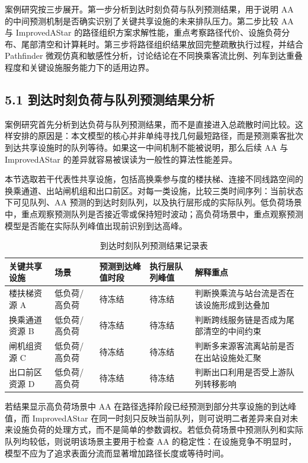 \documentclass[UTF8,a4paper,12pt]{ctexart}
\begin{document}
案例研究按三步展开。第一步分析到达时刻负荷与队列预测结果，用于说明 AA 的中间预测机制是否确实识别了关键共享设施的未来排队压力。第二步比较 AA 与 ImprovedAStar 的路径组织方案求解性能，重点考察路径代价、设施负荷分布、尾部清空和计算耗时。第三步将路径组织结果放回完整疏散执行过程，并结合 Pathfinder 微观仿真和敏感性分析，讨论结论在不同换乘客流比例、列车到达重叠程度和关键设施服务能力下的适用边界。

\subsection{5.1 到达时刻负荷与队列预测结果分析}

案例研究首先分析到达负荷与队列预测结果，而不是直接进入总疏散时间比较。这样安排的原因是：本文模型的核心并非单纯寻找几何最短路径，而是预测乘客批次到达共享设施时的队列等待。如果这一中间机制不能被说明，那么后续 AA 与 ImprovedAStar 的差异就容易被误读为一般性的算法性能差异。

本节选取若干代表性共享设施，包括高换乘参与度的楼扶梯、连接不同线路空间的换乘通道、出站闸机组和出口前区。对每一类设施，比较三类时间序列：当前状态下可见队列、AA 预测的到达时刻队列，以及执行层形成的实际队列。低负荷场景中，重点观察预测队列是否接近零或保持短时波动；高负荷场景中，重点观察预测模型是否能在实际队列峰值出现前识别到达高峰。

\begin{table}[htbp]
\centering
\caption{到达时刻队列预测结果记录表}
\small
\begin{tabular}{p{}p{}p{}p{}p{}}
\toprule
关键共享设施 & 场景 & 预测到达峰值时段 & 执行层队列峰值 & 解释重点 \\
\midrule
楼扶梯资源 A & 低负荷/高负荷 & 待冻结 & 待冻结 & 判断换乘流与站台流是否在该设施形成到达叠加 \\
换乘通道资源 B & 低负荷/高负荷 & 待冻结 & 待冻结 & 判断跨线服务链是否成为尾部清空的中间约束 \\
闸机组资源 C & 低负荷/高负荷 & 待冻结 & 待冻结 & 判断多来源客流离站前是否在出站设施处汇聚 \\
出口前区资源 D & 低负荷/高负荷 & 待冻结 & 待冻结 & 判断出口利用是否受上游队列转移影响 \\
\bottomrule
\end{tabular}
\end{table}

若结果显示高负荷场景中 AA 在路径选择阶段已经预测到部分共享设施的到达峰值，而 ImprovedAStar 在同一时刻只反映当前队列，则可说明二者差异来自对未来设施负荷的处理方式，而不是简单的参数调权。若低负荷场景中预测队列和实际队列均较低，则说明该场景主要用于检查 AA 的稳定性：在设施竞争不明显时，模型不应为了追求表面分流而显著增加路径长度或等待时间。
\end{document}

